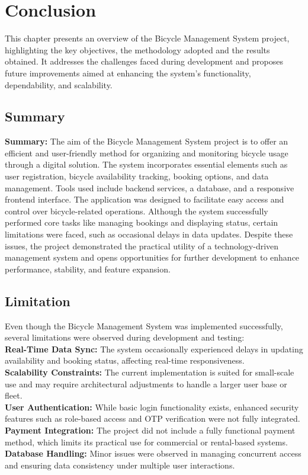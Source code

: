 \chapter{Conclusion}


This chapter presents an overview of the Bicycle Management System project, highlighting the key objectives, the methodology adopted and the results obtained. It addresses the challenges faced during development and proposes future improvements aimed at enhancing the system’s functionality, dependability, and scalability.


\section{Summary}
\textbf {Summary:} The aim of the Bicycle Management System project is to offer an efficient and user-friendly method for organizing and monitoring bicycle usage through a digital solution. The system incorporates essential elements such as user registration, bicycle availability tracking, booking options, and data management. Tools used include backend services, a database, and a responsive frontend interface. The application was designed to facilitate easy access and control over bicycle-related operations. Although the system successfully performed core tasks like managing bookings and displaying status, certain limitations were faced, such as occasional delays in data updates. Despite these issues, the project demonstrated the practical utility of a technology-driven management system and opens opportunities for further development to enhance performance, stability, and feature expansion.\cite{5.1} 
\section{Limitation}
Even though the Bicycle Management System was implemented successfully, several limitations were observed during development and testing:\\
\textbf{Real-Time Data Sync:} The system occasionally experienced delays in updating availability and booking status, affecting real-time responsiveness.\\
\textbf{Scalability Constraints:} The current implementation is suited for small-scale use and may require architectural adjustments to handle a larger user base or fleet.\\
\textbf{User Authentication:} While basic login functionality exists, enhanced security features such as role-based access and OTP verification were not fully integrated.\\
\textbf{Payment Integration:} The project did not include a fully functional payment method, which limits its practical use for commercial or rental-based systems.\\
\textbf{Database Handling:} Minor issues were observed in managing concurrent access and ensuring data consistency under multiple user interactions.\cite{5.2} \\
